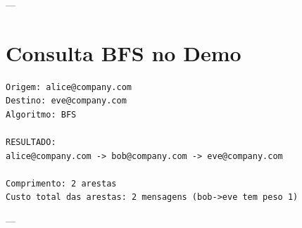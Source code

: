 \documentclass[12pt,openright,twoside,a4paper,english,brazilian,hidelinks]{abntex2}
\begin{document}
    ---

    \section{Consulta BFS no Demo}

    \begin{lstlisting}
Origem: alice@company.com
Destino: eve@company.com
Algoritmo: BFS

RESULTADO:
alice@company.com -> bob@company.com -> eve@company.com

Comprimento: 2 arestas
Custo total das arestas: 2 mensagens (bob->eve tem peso 1)
    \end{lstlisting}

    ---
\end{document}
